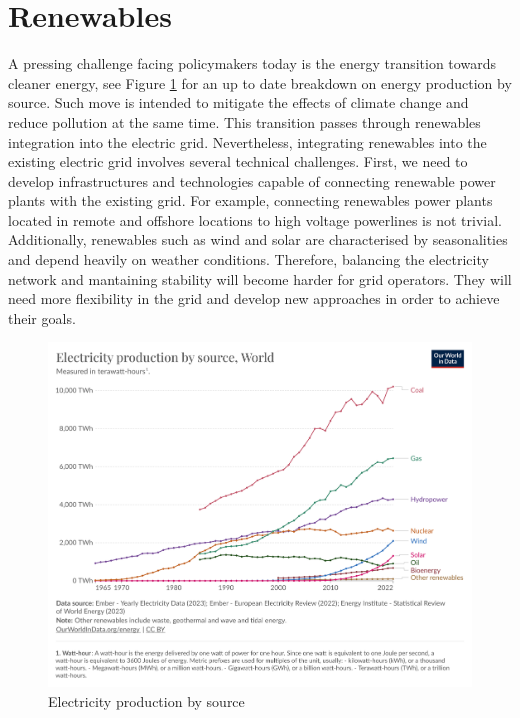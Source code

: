 \section{Renewables}
A pressing challenge facing policymakers today is the energy transition towards cleaner energy, see Figure \ref{fig:electricity_production_by_source} for an up to date breakdown on energy production by source. Such move is intended to mitigate the effects of climate change and reduce pollution at the same time.
This transition passes through renewables integration into the electric grid. 
Nevertheless, integrating renewables into the existing electric grid involves several technical challenges. First, we need to develop infrastructures and technologies capable of connecting renewable power plants with the existing grid. For example, connecting renewables power plants located in remote and offshore locations to high voltage powerlines is not trivial.
Additionally, renewables such as wind and solar are characterised by seasonalities and depend heavily on weather conditions. Therefore, balancing the electricity network and mantaining stability will become harder for grid operators. They will need more flexibility in the grid and develop new approaches in order to achieve their goals.

\begin{figure}[!ht]
    \includegraphics[width=\textwidth]{images/electricity-production-by-source.png}
    \caption{Electricity production by source \cite{energy2023statistical}}    
    \label{fig:electricity_production_by_source}
\end{figure}

